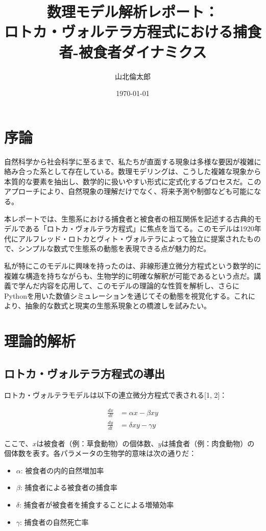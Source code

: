 \documentclass{article}
\title{数理モデル解析レポート：\\ロトカ・ヴォルテラ方程式における捕食者-被食者ダイナミクス}
\author{山北倫太郎}
\date{\today}
\begin{document}
\maketitle

\section{序論}
自然科学から社会科学に至るまで、私たちが直面する現象は多様な要因が複雑に絡み合った系として存在している。数理モデリングは、こうした複雑な現象から本質的な要素を抽出し、数学的に扱いやすい形式に定式化するプロセスだ。このアプローチにより、自然現象の理解だけでなく、将来予測や制御なども可能になる。

本レポートでは、生態系における捕食者と被食者の相互関係を記述する古典的モデルである「ロトカ・ヴォルテラ方程式」に焦点を当てる。このモデルは1920年代にアルフレッド・ロトカとヴィト・ヴォルテラによって独立に提案されたもので、シンプルな数式で生態系の動態を表現できる点が魅力的だ。

私が特にこのモデルに興味を持ったのは、非線形連立微分方程式という数学的に複雑な構造を持ちながらも、生物学的に明確な解釈が可能であるという点だ。講義で学んだ内容を応用して、このモデルの理論的な性質を解析し、さらにPythonを用いた数値シミュレーションを通じてその動態を視覚化する。これにより、抽象的な数式と現実の生態系現象との橋渡しを試みたい。

\section{理論的解析}

\subsection{ロトカ・ヴォルテラ方程式の導出}

ロトカ・ヴォルテラモデルは以下の連立微分方程式で表される[1, 2]：

\begin{align}
\frac{dx}{dt} &= \alpha x - \beta xy \\
\frac{dy}{dt} &= \delta xy - \gamma y
\end{align}

ここで、$x$は被食者（例：草食動物）の個体数、$y$は捕食者（例：肉食動物）の個体数を表す。各パラメータの生物学的意味は次の通りだ：

\begin{itemize}
\item $\alpha$: 被食者の内的自然増加率
\item $\beta$: 捕食者による被食者の捕食率
\item $\delta$: 捕食者が被食者を捕食することによる増殖効率
\item $\gamma$: 捕食者の自然死亡率
\end{itemize}
\end{document}
